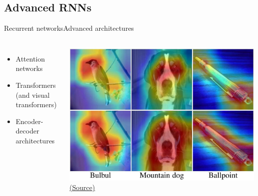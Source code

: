 \documentclass[10pt,compress]{beamer} %
\begin{document}
\subsection{Advanced RNNs}
\begin{frame}{Recurrent networks}{Advanced architectures}
   \begin{columns}
      		\begin{itemize}
	  	\item Attention networks
		\item Transformers (and visual transformers)
          	\item Encoder-decoder architectures
      	    \end{itemize}
 
	    \includegraphics[width=\linewidth]{figs/attention.jpg}\\
	    \scriptsize\href{https://blog.paperspace.com/attention-mechanisms-in-computer-vision-cbam/}{(Source)}\\
    \end{columns}

\end{frame}
\end{document}
